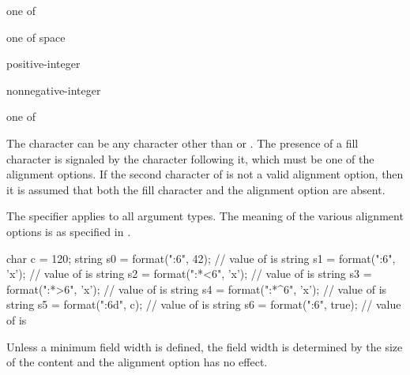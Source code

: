 \begin{ncbnf}
 \textnormal{one of}\br
    \terminal{< > \caret}
\end{ncbnf}

\begin{ncbnf}
 \textnormal{one of}\br
    \terminal{+ -} \textnormal{space}
\end{ncbnf}

\begin{ncbnf}
\br
    positive-integer\br
    \terminal{\{}  \terminal{\}}
\end{ncbnf}

\begin{ncbnf}
\br
     nonnegative-integer\br
     \terminal{\{}  \terminal{\}}
\end{ncbnf}

\begin{ncbnf}
 \textnormal{one of}\br
\end{ncbnf}

\pnum
\begin{note}
The  character can be any character
other than \tcode{\{} or \tcode{\}}.
The presence of a fill character is signaled by the
character following it, which must be one of the alignment options.
If the second character of 
is not a valid alignment option,
then it is assumed that both the fill character and the alignment option are
absent.
\end{note}

\pnum
The  specifier applies to all argument types.
The meaning of the various alignment options is as specified in .
\begin{example}
\begin{codeblock}
char c = 120;
string s0 = format("{:6}", 42);         // value of  is 
string s1 = format("{:6}", 'x');        // value of  is 
string s2 = format("{:*<6}", 'x');      // value of  is 
string s3 = format("{:*>6}", 'x');      // value of  is 
string s4 = format("{:*^6}", 'x');      // value of  is 
string s5 = format("{:6d}", c);         // value of  is 
string s6 = format("{:6}", true);       // value of  is 
\end{codeblock}
\end{example}
\begin{note}
Unless a minimum field width is defined, the field width is determined by
the size of the content and the alignment option has no effect.
\end{note}

